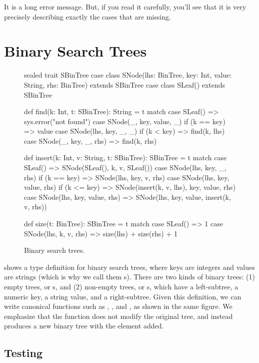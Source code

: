 \documentclass{book}
\begin{document}
It is a long error message. But, if you read it carefully, you'll see that it is
very precisely describing exactly the cases that are missing.

\section{Binary Search Trees}

\begin{figure}
\begin{scalacode}
sealed trait SBinTree
case class SNode(lhs: BinTree, key: Int, value: String, rhs: BinTree) extends SBinTree
case class SLeaf() extends SBinTree

def find(k: Int, t: SBinTree): String = t match {
  case SLeaf() => sys.error("not found")
  case SNode(_, key, value, _) if (k == key) => value
  case SNode(lhs, key, _, _) if (k < key) => find(k, lhs)
  case SNode(_, key, _, rhs) => find(k, rhs)
}

def insert(k: Int, v: String, t: SBinTree): SBinTree = t match {
  case SLeaf() => SNode(SLeaf(), k, v, SLeaf())
  case SNode(lhs, key, _, rhs) if (k == key) => SNode(lhs, key, v, rhs)
  case SNode(lhs, key, value, rhs) if (k <= key) =>  SNode(insert(k, v, lhs), key, value, rhs)
  case SNode(lhs, key, value, rhs) => SNode(lhs, key, value, insert(k, v, rhs))
}

def size(t: BinTree): SBinTree = t match {
  case SLeaf() => 1
  case SNode(lhs, k, v, rhs) => size(lhs) + size(rhs) + 1
}
\end{scalacode}

\caption{Binary search trees.}
\label{bintree}
\end{figure}

 shows a type definition for binary search trees, where
keys are integers and values are strings (which is why we call them
s). There are two
kinds of binary trees: (1) empty trees, or s, and (2)
non-empty trees, or s, which have a left-subtree,
a numeric key, a string value, and a right-subtree.
Given this definition, we can write canonical functions such
as , , and ,
as shown in the same figure.
We emphasize that the  function does not modify the
original tree, and instead produces a new binary tree with the element added.


\subsection{Testing}
\end{document}
